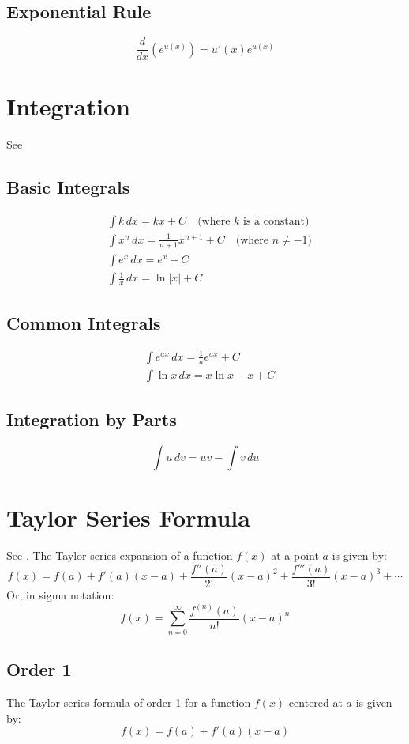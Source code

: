 \documentclass[11pt,a4paper]{book}
\theoremstyle{definition}\newtheorem{definition}{Definition}
\theoremstyle{definition}\newtheorem{fact}{Fact}
\theoremstyle{definition}\newtheorem{remark}{Remark}
\theoremstyle{definition}\newtheorem{ex}{Ex.}
\theoremstyle{definition}\newtheorem{project}{Project}
\theoremstyle{definition}\newtheorem{problem}{Problem}
\theoremstyle{definition}\newtheorem{example}{Example}
\numberwithin{theorem}{section}
\numberwithin{corollary}{chapter}
\numberwithin{assumption}{chapter}
\numberwithin{definition}{chapter}
\numberwithin{prop}{chapter}
\numberwithin{notation}{chapter}
\numberwithin{problem}{chapter}
\numberwithin{example}{chapter}
\numberwithin{fact}{chapter}
\numberwithin{ex}{chapter}
\begin{document}
\begin{appendices}
	\subsection*{Exponential Rule}
	\[
	\frac{d}{dx} (e^{u(x)}) = u'(x) e^{u(x)}
	\]
	
	\section{Integration}
	See \citet[Ch. 8]{springcamp}
	\subsection*{Basic Integrals}
	\begin{align*}
		&\int k \, dx = kx + C \quad \text{(where $k$ is a constant)} \\
		&\int x^n \, dx = \frac{1}{n+1} x^{n+1} + C \quad \text{(where $n \neq -1$)} \\
		&\int e^x \, dx = e^x + C \\
		&\int \frac{1}{x} \, dx = \ln |x| + C
	\end{align*}
	
	\subsection*{Common Integrals}
	\begin{align*}
		&\int e^{ax} \, dx = \frac{1}{a} e^{ax} + C \\
		&\int \ln x \, dx = x \ln x - x + C
	\end{align*}
	
	\subsection*{Integration by Parts}
	\[
	\int u \, dv = uv - \int v \, du
	\]
	
	\section{Taylor Series Formula}
	See \citet[Ch. 6.6]{springcamp}. The Taylor series expansion of a function $f(x)$ at a point $a$ is given by:
	\[
	f(x) = f(a) + f'(a)(x - a) + \frac{f''(a)}{2!}(x - a)^2 + \frac{f'''(a)}{3!}(x - a)^3 + \dotsb
	\]
	Or, in sigma notation:
	\[
	f(x) = \sum_{n=0}^{\infty} \frac{f^{(n)}(a)}{n!}(x - a)^n
	\]
	\subsection*{Order 1}
	The Taylor series formula of order 1 for a function $f(x)$ centered at $a$ is given by:
	\[
	f(x) = f(a) + f'(a)(x - a)
	\]
	

\end{appendices}
\end{document}
